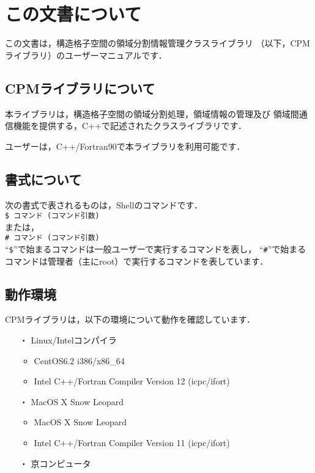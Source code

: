\section{この文書について}
\label{summary}
この文書は，構造格子空間の領域分割情報管理クラスライブラリ
（以下，CPMライブラリ）のユーザーマニュアルです．

\subsection{CPMライブラリについて}
本ライブラリは，構造格子空間の領域分割処理，領域情報の管理及び
領域間通信機能を提供する，C++で記述されたクラスライブラリです．

ユーザーは，C++/Fortran90で本ライブラリを利用可能です．
\\
\subsection{書式について}
次の書式で表されるものは，Shellのコマンドです．\\

{\tt\$ コマンド (コマンド引数)}\\

または，\\

{\tt\# コマンド (コマンド引数) }\\

\noindent
``{\tt\$}''で始まるコマンドは一般ユーザーで実行するコマンドを表し，
``{\tt\#}''で始まるコマンドは管理者（主にroot）で実行するコマンドを表しています．

\subsection{動作環境}
CPMライブラリは，以下の環境について動作を確認しています．
\begin{itemize}
 \item[・] {Linux/Intelコンパイラ}
 \begin{itemize}
   \item{CentOS6.2 i386/x86\_64}
   \item{Intel C++/Fortran Compiler Version 12 (icpc/ifort)}
 \end{itemize}
 \item[・] {MacOS X Snow Leopard}
 \begin{itemize}
  \item{MacOS X Snow Leopard}
   \item{Intel C++/Fortran Compiler Version 11 (icpc/ifort)}
 \end{itemize}
 \item[・] {京コンピュータ}
\end{itemize}
